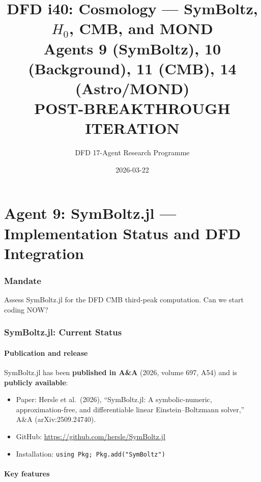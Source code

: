\documentclass[11pt,a4paper]{article}
\title{DFD i40: Cosmology --- SymBoltz, $H_0$, CMB, and MOND\\[6pt]
\large Agents 9 (SymBoltz), 10 (Background), 11 (CMB), 14 (Astro/MOND)\\[6pt]
\normalsize POST-BREAKTHROUGH ITERATION}
\author{DFD 17-Agent Research Programme}
\date{2026-03-22}
\begin{document}
\maketitle
\tableofcontents
\newpage

\part{Agent 9: SymBoltz.jl --- Implementation Status and DFD Integration}
\label{part:agent9}

\section{Mandate}
Assess SymBoltz.jl for the DFD CMB third-peak computation. Can we start coding NOW?

\section{SymBoltz.jl: Current Status}

\subsection{Publication and release}

SymBoltz.jl has been \textbf{published in A\&A} (2026, volume 697, A54) and is \textbf{publicly available}:
\begin{itemize}
\item Paper: Hersle et al.\ (2026), ``SymBoltz.jl: A symbolic-numeric, approximation-free, and differentiable linear Einstein--Boltzmann solver,'' A\&A (arXiv:2509.24740).
\item GitHub: \url{https://github.com/hersle/SymBoltz.jl}
\item Installation: \texttt{using Pkg; Pkg.add("SymBoltz")}
\end{itemize}

\subsection{Key features}
\end{document}
